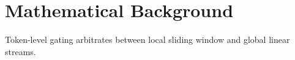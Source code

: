 \section{Mathematical Background}Token-level gating arbitrates between local sliding window and global linear streams.
